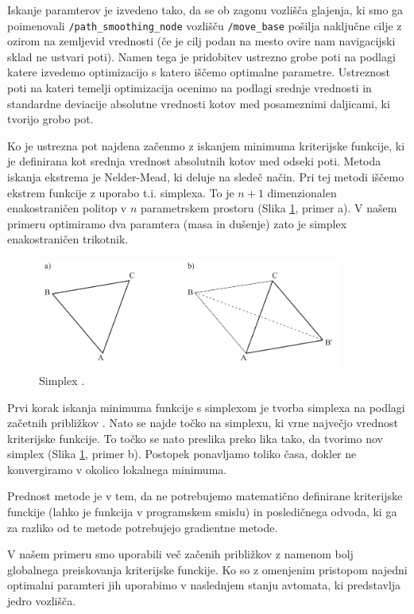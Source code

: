 \documentclass[10pt,a4paper]{article}
\begin{document}
Iskanje paramterov je izvedeno tako, da se ob zagonu vozlišča glajenja, ki smo ga poimenovali \newline \texttt{/path\_smoothing\_node} vozlišču \texttt{/move\_base} pošilja naključne cilje z ozirom na zemljevid vrednosti (če je cilj podan na mesto ovire nam navigacijski sklad ne ustvari poti). Namen tega je pridobitev ustrezno grobe poti na podlagi katere izvedemo optimizacijo s katero iščemo optimalne parametre. Ustreznost poti na kateri temelji optimizacija ocenimo na podlagi srednje vrednosti in standardne deviacije absolutne vrednosti kotov med posameznimi daljicami, ki tvorijo grobo pot.

Ko je ustrezna pot najdena začenmo z iskanjem minimuma kriterijske funkcije, ki je definirana kot srednja vrednost absolutnih kotov med odseki poti. Metoda iskanja ekstrema je Nelder-Mead, ki deluje na sledeč način. Pri tej metodi iščemo ekstrem funkcije z uporabo t.i. simplexa. To je $n+1$ dimenzionalen enakostraničen politop v $n$ parametrskem prostoru (Slika \ref{fig:slika6}, primer a). V našem primeru optimiramo dva paramtera (masa in dušenje) zato je simplex enakostraničen trikotnik.

\begin{figure}[H]
	\centering
	\includegraphics[width=10cm]{pic/simplex.png}
	\caption{Simplex \cite{vir11}.}
	\label{fig:slika6}
\end{figure}

Prvi korak iskanja minimuma funkcije s simplexom je tvorba simplexa na podlagi začetnih približkov \cite{vir11}. Nato se najde točko na simplexu, ki vrne največjo vrednost kriterijske funkcije. To točko se nato preslika preko lika tako, da tvorimo nov simplex (Slika \ref{fig:slika6}, primer b). Postopek ponavljamo toliko časa, dokler ne konvergiramo v okolico lokalnega minimuma.

Prednost metode je v tem, da ne potrebujemo matematično definirane kriterijske funckije (lahko je funkcija v programskem smislu) in posledičnega odvoda, ki ga za razliko od te metode potrebujejo gradientne metode.

V našem primeru smo uporabili več začenih približkov z namenom bolj globalnega preiskovanja kriterijske funckije. Ko so z omenjenim pristopom najedni optimalni paramteri jih uporabimo v naslednjem stanju avtomata, ki predstavlja jedro vozlišča.
\end{document}
